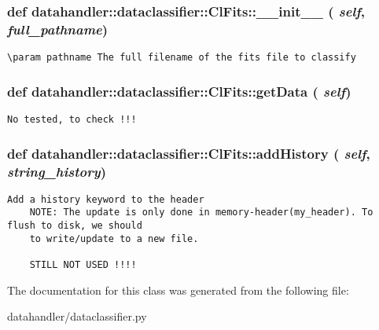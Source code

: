 \subsubsection{\setlength{\rightskip}{0pt plus 5cm}def datahandler::dataclassifier::Cl\-Fits::\_\-\_\-init\_\-\_\- ( {\em self},  {\em full\_\-pathname})}\label{classdatahandler_1_1dataclassifier_1_1ClFits_8772ed624574e27b48b57e6e4d12f0d8}




\footnotesize\begin{verbatim}
\param pathname The full filename of the fits file to classify
\end{verbatim}
\normalsize
\subsubsection{\setlength{\rightskip}{0pt plus 5cm}def datahandler::dataclassifier::Cl\-Fits::get\-Data ( {\em self})}\label{classdatahandler_1_1dataclassifier_1_1ClFits_c0a3d6b891159b9e7434d851c9bbb9d1}




\footnotesize\begin{verbatim}No tested, to check !!!\end{verbatim}
\normalsize
\subsubsection{\setlength{\rightskip}{0pt plus 5cm}def datahandler::dataclassifier::Cl\-Fits::add\-History ( {\em self},  {\em string\_\-history})}\label{classdatahandler_1_1dataclassifier_1_1ClFits_436258fc9b4fc4be21127c2483ae14ee}




\footnotesize\begin{verbatim}Add a history keyword to the header
    NOTE: The update is only done in memory-header(my_header). To flush to disk, we should
    to write/update to a new file. 
    
    STILL NOT USED !!!!
\end{verbatim}
\normalsize
 

The documentation for this class was generated from the following file:\begin{CompactItemize}
\item 
datahandler/dataclassifier.py\end{CompactItemize}
